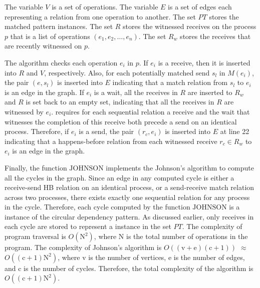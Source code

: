 The variable $\mathit{V}$ is a set of operations. The variable $\mathit{E}$ is a set of edges each representing a relation from one operation to another. 
The set $\mathit{PT}$ stores the matched pattern instances.
The set $\mathit{R}$ stores the witnessed receives on the process $p$ that is a list of operations $(e_1, e_2, \dots, e_n)$. 
The set $\mathit{R_w}$ stores the receives that are recently witnessed on $p$.

The algorithm checks each operation $e_i$ in $p$. 
If $\mathit{e_i}$ is a receive, then it is inserted into $\mathit{R}$ and $\mathit{V}$, respectively. Also, for each potentially matched send $\mathit{s_l}$ in $\mathit{M}(\mathit{e_i})$, the pair $(\mathit{e},\mathit{s_l})$ is inserted into $\mathit{E}$ indicating that a match relation from $\mathit{s_l}$ to $\mathit{e_i}$ is an edge in the graph. If $\mathit{e_i}$ is a wait, all the receives in $\mathit{R}$ are inserted to $\mathit{R_w}$ and $\mathit{R}$ is set back to an empty set, indicating that all the receives in $\mathit{R}$ are witnessed by $\mathit{e_i}$.  requires for each sequential relation a receive and the wait that witnesses the completion of this receive both precede a send on an identical process. Therefore, %
if $\mathit{e_i}$ is a send, the pair $(\mathit{r_c},\mathit{e_i})$ is inserted into $\mathit{E}$ at line 22 indicating that a happens-before relation from each witnessed receive $\mathit{r_c}\in\mathit{R_w}$ to $\mathit{e_i}$ is an edge in the graph. 

Finally, the function $\mathrm{JOHNSON}$ implements the Johnson's algorithm to compute all the cycles in the graph. Since an edge in any computed cycle is either a receive-send HB relation on an identical process, or a send-receive match relation across two processes, there exists exactly one sequential relation for any process in the cycle. Therefore, each cycle computed by the function $\mathrm{JOHNSON}$ is a instance of the circular dependency pattern. As discussed earlier, only receives in each cycle are stored to represent a instance in the set $\mathit{PT}$. The complexity of program traversal is $O(\mathrm{N}^2)$, where $\mathrm{N}$ is the total number of operations in the program. The complexity of Johnson's algorithm is $O((\mathrm{v}+\mathrm{e})(\mathrm{c}+1))$ $\approx$ $O((\mathrm{c}+1)\mathrm{N}^2)$, where $\mathrm{v}$ is the number of vertices, $\mathrm{e}$ is the number of edges, and $\mathrm{c}$ is the number of cycles. Therefore, the total complexity of the algorithm is $O((\mathrm{c}+1)\mathrm{N}^2)$.

